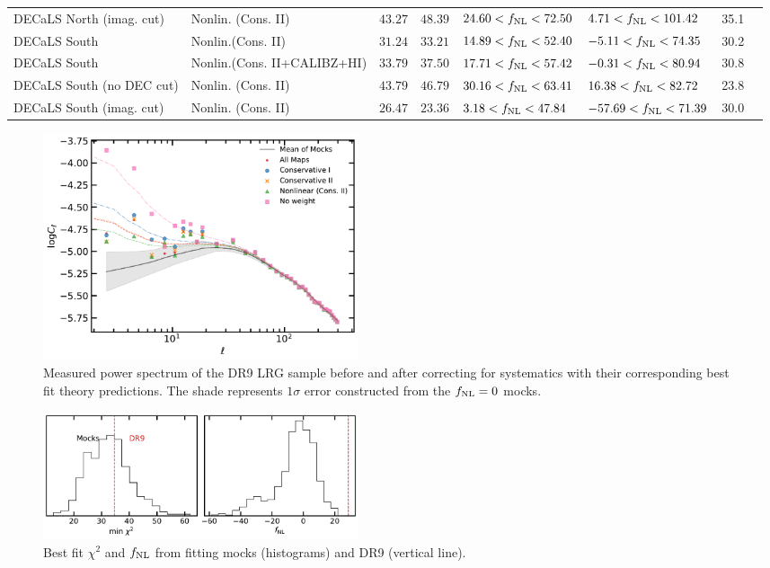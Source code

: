 \begin{table}
{\begin{tabular}{llllllll}
DECaLS North (imag. cut)  & Nonlin. (Cons. II)& $ 43.27$& $ 48.39$& $ 24.60<f_{\rm NL}< 72.50$& $  4.71<f_{\rm NL}<101.42$ &   35.1\\
DECaLS South              & Nonlin.(Cons. II)& $ 31.24$& $ 33.21$& $ 14.89<f_{\rm NL}< 52.40$& $ -5.11<f_{\rm NL}< 74.35$ &   30.2\\
DECaLS South              & Nonlin.(Cons. II+CALIBZ+HI)& $ 33.79$& $ 37.50$& $ 17.71<f_{\rm NL}< 57.42$& $ -0.31<f_{\rm NL}< 80.94$ &   30.8\\
DECaLS South (no DEC cut) & Nonlin. (Cons. II)& $ 43.79$& $ 46.79$& $ 30.16<f_{\rm NL}< 63.41$& $ 16.38<f_{\rm NL}< 82.72$ &   23.8\\
DECaLS South (imag. cut)  & Nonlin. (Cons. II)& $ 26.47$& $ 23.36$& $  3.18<f_{\rm NL}< 47.84$& $-57.69<f_{\rm NL}< 71.39$ &   30.0\\
\hline
    \end{tabular}
}
\end{table}


\begin{figure}
    \centering
    \includegraphics[width=0.45\textwidth]{figures/model_dr9.pdf} 
    \caption{Measured power spectrum of the DR9 LRG sample before and after correcting for systematics with their corresponding best fit theory predictions. The shade represents $1\sigma$ error constructed from the $f_{\rm NL}=0$ mocks.}
    \label{fig:cl_dr9}
\end{figure}

\begin{figure}
\centering
    \includegraphics[width=0.45\textwidth]{figures/pdf_dr9vsmocks.pdf} 
    \caption{Best fit $\chi^{2}$ and $f_{\rm NL}$ from fitting mocks (histograms) and DR9 (vertical line).}\label{fig:dr9vsmocks}
\end{figure}

